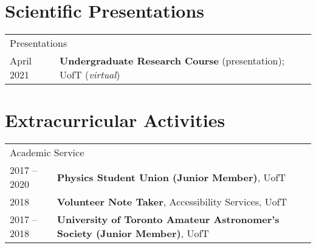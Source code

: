 \documentclass[10pt]{res} %
\begin{document}
\begin{resume}
\section{\Large Scientific Presentations}
\vspace{-5pt} %
\noindent\makebox[\linewidth]{\rule{\textwidth}{0.4pt}}
\vspace{-20pt} %

\begin{table}[h!]
\begin{tabularx}{\textwidth}{lX}
\multicolumn{2}{l}{ \rule{0pt}{3ex} \large \hspace{-12pt} Presentations \dotfill \rule[-1.2ex]{0pt}{0pt}} \\
April 2021 & \textbf{Undergraduate Research Course} (presentation); UofT (\textit{virtual})
\end{tabularx}

\end{table}



\section{\Large Extracurricular Activities}
\vspace{-5pt} %
\noindent\makebox[\linewidth]{\rule{\textwidth}{0.4pt}}
\vspace{-20pt} %

\begin{table}[h]
\begin{tabularx}{\textwidth}{ @{} p{6.5em} X @{} }

\multicolumn{2}{l}{ \rule{0pt}{3ex} \large \hspace{-12pt} Academic Service \dotfill \rule[-1.2ex]{0pt}{0pt}} \\ 
2017 -- 2020 & \textbf{Physics Student Union (Junior Member)}, UofT \\
2018 & \textbf{Volunteer Note Taker}, Accessibility Services, UofT \\
2017 -- 2018 & \textbf{University of Toronto Amateur Astronomer's Society (Junior Member)}, UofT \\


\end{tabularx}
\end{table}
\end{resume}
\end{document}
